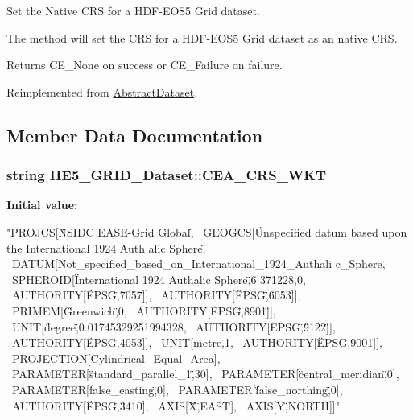 Set the Native CRS for a HDF-\/EOS5 Grid dataset. 

The method will set the CRS for a HDF-\/EOS5 Grid dataset as an native CRS.

\begin{DoxyReturn}{Returns}
CE\_\-None on success or CE\_\-Failure on failure. 
\end{DoxyReturn}


Reimplemented from \hyperlink{classAbstractDataset_acfac922d16e5edf51066169bd6ff28ec}{AbstractDataset}.



\subsection{Member Data Documentation}
\hypertarget{classHE5__GRID__Dataset_a85e32fcace9647574087635cee1a0cfd}{
\subsubsection[{CEA\_\-CRS\_\-WKT}]{\setlength{\rightskip}{0pt plus 5cm}string HE5\_\-GRID\_\-Dataset::CEA\_\-CRS\_\-WKT}}
\label{classHE5__GRID__Dataset_a85e32fcace9647574087635cee1a0cfd}
{\bfseries Initial value:}
\begin{DoxyCode}
"PROJCS[\"NSIDC EASE-Grid Global\", \
                GEOGCS[\"Unspecified datum based upon the International 1924 Auth
      alic Sphere\", \
                        DATUM[\"Not_specified_based_on_International_1924_Authali
      c_Sphere\", \
                                SPHEROID[\"International 1924 Authalic Sphere\",6
      371228,0, \
                                        AUTHORITY[\"EPSG\",\"7057\"]], \
                                AUTHORITY[\"EPSG\",\"6053\"]], \
                        PRIMEM[\"Greenwich\",0, \
                                AUTHORITY[\"EPSG\",\"8901\"]], \
                        UNIT[\"degree\",0.01745329251994328, \
                                AUTHORITY[\"EPSG\",\"9122\"]], \
                        AUTHORITY[\"EPSG\",\"4053\"]], \
                UNIT[\"metre\",1, \
                        AUTHORITY[\"EPSG\",\"9001\"]], \
                PROJECTION[\"Cylindrical_Equal_Area\"], \
                PARAMETER[\"standard_parallel_1\",30], \
                PARAMETER[\"central_meridian\",0], \
                PARAMETER[\"false_easting\",0], \
                PARAMETER[\"false_northing\",0], \
                AUTHORITY[\"EPSG\",\"3410\"], \
                AXIS[\"X\",EAST], \
                AXIS[\"Y\",NORTH]]"
\end{DoxyCode}
